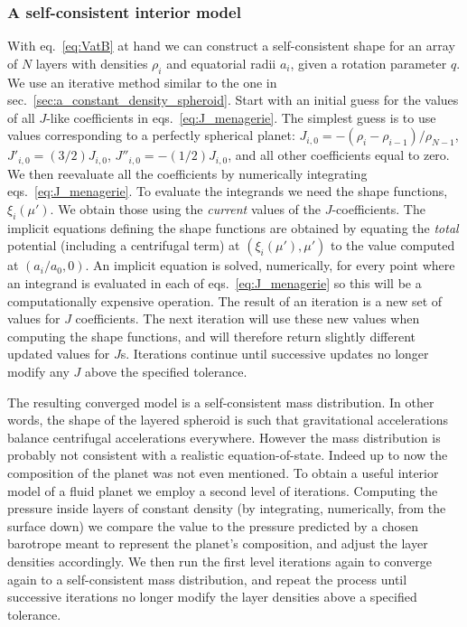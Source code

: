 \documentclass[amsmath,amsfonts,rmp,letterpaper]{revtex4}
\begin{document}
\subsubsection{A self-consistent interior model}

With eq.~\eqref{eq:VatB} at hand we can construct a self-consistent shape for an
array of $N$ layers with densities $\rho_i$ and equatorial radii $a_i$, given a
rotation parameter $q$. We use an iterative method similar to the one in
sec.~\ref{sec:a_constant_density_spheroid}. Start with an initial guess for the
values of all $J$-like coefficients in eqs.~\eqref{eq:J_menagerie}. The simplest
guess is to use values corresponding to a perfectly spherical planet:
$J_{i,0}=-(\rho_i-\rho_{i-1})/\rho_{N-1}$, $J'_{i,0}=(3/2)J_{i,0}$,
$J''_{i,0}=-(1/2)J_{i,0}$, and all other coefficients equal to zero. We then
reevaluate all the coefficients by numerically integrating
eqs.~\eqref{eq:J_menagerie}. To evaluate the integrands we need the shape
functions, $\xi_i(\mu')$. We obtain those using the \emph{current} values of the
$J$-coefficients. The implicit equations defining the shape functions are obtained
by equating the \emph{total} potential (including a centrifugal term) at
$(\xi_i(\mu'),\mu')$ to the value computed at $(a_i/a_0,0)$. An implicit equation
is solved, numerically, for every point where an integrand is evaluated in each of
eqs.~\eqref{eq:J_menagerie} so this will be a computationally expensive operation.
The result of an iteration is a new set of values for $J$ coefficients. The next
iteration will use these new values when computing the shape functions, and will
therefore return slightly different updated values for $J$s. Iterations continue
until successive updates no longer modify any $J$ above the specified tolerance.

The resulting converged model is a self-consistent mass distribution. In other
words, the shape of the layered spheroid is such that gravitational accelerations
balance centrifugal accelerations everywhere. However the mass distribution is
probably not consistent with a realistic equation-of-state. Indeed up to now the
composition of the planet was not even mentioned. To obtain a useful interior
model of a fluid planet we employ a second level of iterations. Computing the
pressure inside layers of constant density (by integrating, numerically, from the
surface down) we compare the value to the pressure predicted by a chosen barotrope
meant to represent the planet's composition, and adjust the layer densities
accordingly. We then run the first level iterations again to converge again to a
self-consistent mass distribution, and repeat the process until successive
iterations no longer modify the layer densities above a specified tolerance.
\end{document}
